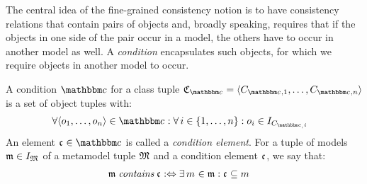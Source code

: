 The central idea of the fine-grained consistency notion is to have consistency relations that contain pairs of objects and, broadly speaking, requires that if the objects in one side of the pair occur in a model, the others have to occur in another model as well.
A \emph{condition} encapsulates such objects, for which we require objects in another model to occur.

\begin{definition}[Condition]
    A condition $\condition{c}{}$ for a class tuple $\classtuple{C}{\condition{c}{}} = \tupled{\class{C}{\condition{c}{},1}, \dots, \class{C}{\condition{c}{},n}}$ is a set of object tuples %
    with: 
    \begin{align*}
    &
    \forall \tupled{\object{o}{1}, \dots, \object{o}{n}} \in \condition{c}{}: \forall i \in \setted{1, \dots, n} : \object{o}{i} \in \instances{\class{C}{\condition{c}, i}}
    \end{align*}
    An element $\conditionelement{c}{} \in \condition{c}{}$ is called a \emph{condition element}.
    For a tuple of models $\modeltuple{m} \in \metamodeltupleinstanceset{M}$ of a metamodel tuple $\metamodeltuple{M}$ and %
    a condition element $\conditionelement{c}{}$, %
    we say that: 
    \begin{align*}
        &
        \modeltuple{m} \containsmath \conditionelement{c}{} \equivalentperdefinition
        \exists \model{m}{} \in \modeltuple{m} : \conditionelement{c}{} \subseteq \model{m}{}
    \end{align*}
\end{definition}

